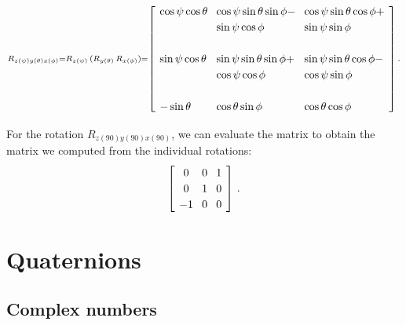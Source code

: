 \documentclass[11pt,a4paper]{report}
\newcommand*{\spacearray}{
\renewcommand{\arraystretch}{1.2}
\setlength{\arraycolsep}{4pt}
}
\begin{document}
\[
\spacearray
\begin{scriptstyle}
R_{z(\psi)y(\theta)x(\phi)}=R_{z(\psi)}\,(R_{y(\theta)} \, R_{x(\phi)}) =
\left[
\begin{array}{lll}
\cos\psi\cos\theta  &  \cos\psi\sin\theta\sin\phi- & \cos\psi\sin\theta\cos\phi+ \\
                    &  \sin\psi\cos\phi & \sin\psi\sin\phi\\
\\
\sin\psi\cos\theta &\sin\psi\sin\theta\sin\phi+ & \sin\psi\sin\theta\cos\phi-\\
&\cos\psi\cos\phi  &\cos\psi\sin\phi\\
\\
-\sin\theta & \cos\theta\sin\phi& \cos\theta\cos\phi\\
\end{array}
\right]\,.
\end{scriptstyle}
\]

For the rotation $R_{z(90)y(90)x(90)}$, we can evaluate the matrix to obtain the matrix we computed from the individual rotations:
\[
\spacearray
\left[\begin{array}{ccc}0&0&1\\0&1&0\\-1&0&0\\\end{array}\right]\,.
\]


\chapter{Quaternions}

\section{Complex numbers}
\end{document}
